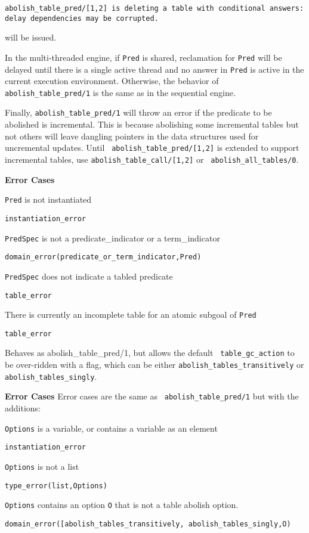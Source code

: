 \begin{description}
\begin{description}
{\tt abolish\_table\_pred/[1,2] is deleting a table with
  conditional\ answers: \\ delay dependencies may be corrupted.}

will be issued.  

In the multi-threaded engine, if {\tt Pred} is shared, reclamation for
{\tt Pred} will be delayed until there is a single active thread and
no answer in {\tt Pred} is active in the current execution
environment.  Otherwise, the behavior of {\tt abolish\_table\_pred/1}
is the same as in the sequential engine.

Finally, {\tt abolish\_table\_pred/1} will throw an error if the
predicate to be abolished is incremental.  This is because abolishing
some incremental tables but not others will leave dangling pointers in
the data structures used for uncremental updates.  Until {\tt
  abolish\_table\_pred/[1,2]} is extended to support incremental
tables, use {\tt abolish\_table\_call/[1,2]} or {\tt
  abolish\_all\_tables/0}.

{\bf Error Cases}
\bi
%
\item {\tt Pred} is not instantiated
 \bi 
 \item 	{\tt instantiation\_error}
 \ei
%
\item {\tt PredSpec} is not a predicate\_indicator or a term\_indicator
 \bi
 \item 	{\tt domain\_error(predicate\_or\_term\_indicator,Pred)}
 \ei
%
\item {\tt PredSpec} does not indicate a tabled predicate
 \bi
 \item 	{\tt table\_error}
 \ei
%
\item There is currently an incomplete table for an atomic subgoal of
  {\tt Pred}
 \bi
 \item 	{\tt table\_error}
 \ei
%
\ei

%
Behaves as {abolish\_table\_pred/1}, but allows the default {\tt
  table\_gc\_action} to be over-ridden with a flag, which can be either 
{\tt abolish\_tables\_transitively} or {\tt abolish\_tables\_singly}.

{\bf Error Cases} Error cases are the same as {\tt
  abolish\_table\_pred/1} but with the additions: 
\bi
\item {\tt Options} is a variable, or contains a variable as an element
\bi
\item {\tt instantiation\_error}
\ei
\item {\tt Options} is not a list
\bi
\item {\tt type\_error(list,Options)}
\ei
\item {\tt Options} contains an option {\tt O} that is not a
  table abolish option.
\bi
\item {\tt domain\_error([abolish\_tables\_transitively, abolish\_tables\_singly,O)}
\ei
\ei


\end{description}
\end{description}
